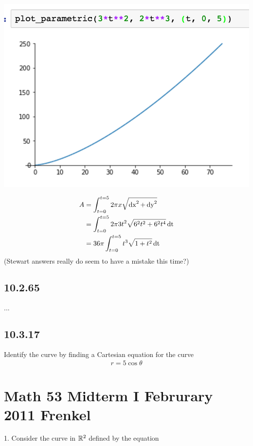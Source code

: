 \documentclass[12pt]{article}
\begin{document}
\begin{mdframed}
  \includegraphics[width=400pt]{img/10-2-66.png}

  \begin{align*}
    A &= \int_{t=0}^{t=5} 2\pi x \sqrt{\operatorname{\text{dx}}^2 + \operatorname{\text{dy}}^2}\\
      &= \int_{t=0}^{t=5} 2\pi 3t^2 \sqrt{6^2t^2 + 6^2t^4} \operatorname{\text{dt}}\\
      &= 36\pi \int_{t=0}^{t=5} t^3 \sqrt{1 + t^2} \operatorname{\text{dt}}\\
  \end{align*}
  (Stewart answers really do seem to have a mistake this time?)
\end{mdframed}

\subsection*{10.2.65}
...

\subsection*{10.3.17}
Identify the curve by finding a Cartesian equation for the curve
\begin{align*}
  r = 5\cos\theta
\end{align*}


\section{Math 53 Midterm I Februrary 2011 Frenkel}

1. Consider the curve in $\mathbb{R}^2$ defined by the equation
\end{document}
